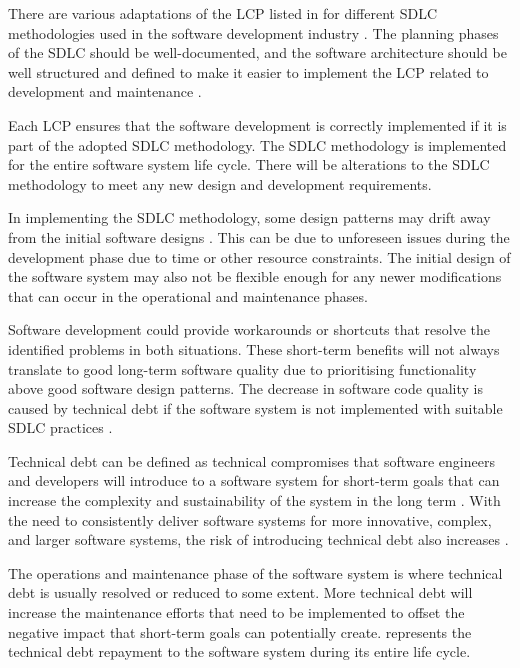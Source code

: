 There are various adaptations of the LCP listed in  for different SDLC methodologies used in the software development industry \cite{Al-Saiyd2015}. The planning phases of the SDLC should be well-documented, and the software architecture should be well structured and defined to make it easier to implement the LCP related to development and maintenance \cite{Ackermann2009}.\par Each LCP ensures that the software development is correctly implemented if it is part of the adopted SDLC methodology. The SDLC methodology is implemented for the entire software system life cycle. There will be alterations to the SDLC methodology to meet any new design and development requirements. \par In implementing the SDLC methodology, some design patterns may drift away from the initial software designs \cite{Reimanis2016}. This can be due to unforeseen issues during the development phase due to time or other resource constraints. The initial design of the software system may also not be flexible enough for any newer modifications that can occur in the operational and maintenance phases. \par Software development could provide workarounds or shortcuts that resolve the identified problems in both situations. These short-term benefits will not always translate to good long-term software quality due to prioritising functionality above good software design patterns. The decrease in software code quality is caused by technical debt if the software system is not implemented with suitable SDLC practices \cite{DeLeon-Sigg2020, Reimanis2016}. \par Technical debt can be defined as technical compromises that software engineers and developers will introduce to a software system for short-term goals that can increase the complexity and sustainability of the system in the long term \cite{Snipes2018, Gralha2018}. With the need to consistently deliver software systems for more innovative, complex, and larger software systems, the risk of introducing technical debt also increases \cite{Reimanis2016, Khan2013}. \par The operations and maintenance phase of the software system is where technical debt is usually resolved or reduced to some extent. More technical debt will increase the maintenance efforts that need to be implemented to offset the negative impact that short-term goals can potentially create.  represents the technical debt repayment to the software system during its entire life cycle.

